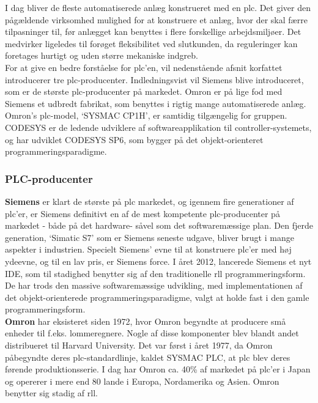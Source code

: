 I dag bliver de fleste automatiserede anlæg konstrueret med en \gls{plc}. Det giver den pågældende virksomhed mulighed for at konstruere et anlæg, hvor der skal færre tilpasninger til, før anlægget kan benyttes i flere forskellige arbejdsmiljøer. Det medvirker ligeledes til forøget fleksibilitet ved slutkunden, da reguleringer kan foretages hurtigt og uden større mekaniske indgreb.\\

\noindent For at give en bedre forståelse for \gls{plc}'en, vil nedenstående afsnit korfattet introducerer tre \gls{plc}-producenter. Indledningsvist vil Siemens blive introduceret, som er de største \gls{plc}-producenter på markedet. Omron er på lige fod med Siemens et udbredt fabrikat, som benyttes i rigtig mange automatiserede anlæg. Omron's \gls{plc}-model, \enquote*{SYSMAC CP1H}, er samtidig tilgængelig for gruppen. CODESYS er de ledende udviklere af softwareapplikation til controller-systemets, og har udviklet CODESYS SP6, som bygger på det objekt-orienteret programmeringsparadigme.

\subsubsection*{PLC-producenter}

\noindent\textbf{Siemens} er klart de største på \gls{plc} markedet, og igennem fire generationer af \gls{plc}'er, er Siemens definitivt en af de mest kompetente \gls{plc}-producenter på markedet - både på det hardware- såvel som det softwaremæssige plan. Den fjerde generation, \enquote*{Simatic S7} som er Siemens seneste udgave, bliver brugt i mange aspekter i industrien. Specielt Siemens' evne til at konstruere \gls{plc}'er med høj ydeevne, og til en lav pris, er Siemens force. I året 2012, lancerede Siemens et nyt IDE, som til stadighed benytter sig af den traditionelle \gls{rll} programmeringsform. De har trods den massive softwaremæssige udvikling, med implementationen af det objekt-orienterede programmeringsparadigme, valgt at holde fast i den gamle programmeringsform. \\

\noindent\textbf{Omron} har eksisteret siden 1972, hvor Omron begyndte at producere små enheder til f.eks. lommeregnere. Nogle af disse komponenter blev blandt andet distribueret til Harvard University. Det var først i året 1977, da Omron påbegyndte deres \gls{plc}-standardlinje, kaldet SYSMAC PLC, at \gls{plc} blev deres førende produktionsserie. I dag har Omron ca. 40\% af markedet på \gls{plc}'er i Japan og opererer i mere end 80 lande i Europa, Nordamerika og Asien. Omron benytter sig stadig af \gls{rll}.\\

